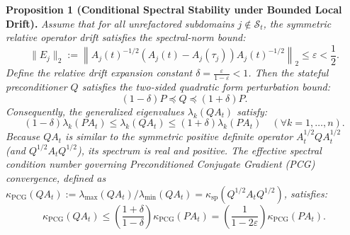 \documentclass[preprint,12pt,3p]{elsarticle}
\begin{document}
\noindent\textbf{Proposition 1 (Conditional Spectral Stability under Bounded Local Drift).}
\textit{Assume that for all unrefactored subdomains $j \notin \mathcal{S}_t$, the symmetric relative operator drift satisfies the spectral-norm bound:
\begin{equation}
\|E_j\|_2 := \left\| A_j(t)^{-1/2} \left( A_j(t) - A_j(\tau_j) \right) A_j(t)^{-1/2} \right\|_2 \le \varepsilon < \frac{1}{2}.
\label{eq:prop_condition}
\end{equation}
Define the relative drift expansion constant $\delta = \frac{\varepsilon}{1 - \varepsilon} < 1$. Then the stateful preconditioner $Q$ satisfies the two-sided quadratic form perturbation bound:
\begin{equation}
(1 - \delta) P \preceq Q \preceq (1 + \delta) P.
\label{eq:quadratic_bound}
\end{equation}
Consequently, the generalized eigenvalues $\lambda_k(Q A_t)$ satisfy:
\begin{equation}
(1 - \delta) \lambda_k(P A_t) \le \lambda_k(Q A_t) \le (1 + \delta) \lambda_k(P A_t) \quad (\forall k=1, \dots, n).
\end{equation}
Because $Q A_t$ is similar to the symmetric positive definite operator $A_t^{1/2} Q A_t^{1/2}$ (and $Q^{1/2} A_t Q^{1/2}$), its spectrum is real and positive. The effective spectral condition number governing Preconditioned Conjugate Gradient (PCG) convergence, defined as $\kappa_{\text{PCG}}(Q A_t) := \lambda_{\max}(Q A_t) / \lambda_{\min}(Q A_t) = \kappa_{\text{sp}}(Q^{1/2} A_t Q^{1/2})$, satisfies:
\begin{equation}
\kappa_{\text{PCG}}(Q A_t) \le \left( \frac{1 + \delta}{1 - \delta} \right) \kappa_{\text{PCG}}(P A_t) = \left( \frac{1}{1 - 2\varepsilon} \right) \kappa_{\text{PCG}}(P A_t).
\label{eq:condition_number_bound}
\end{equation}}
\end{document}
